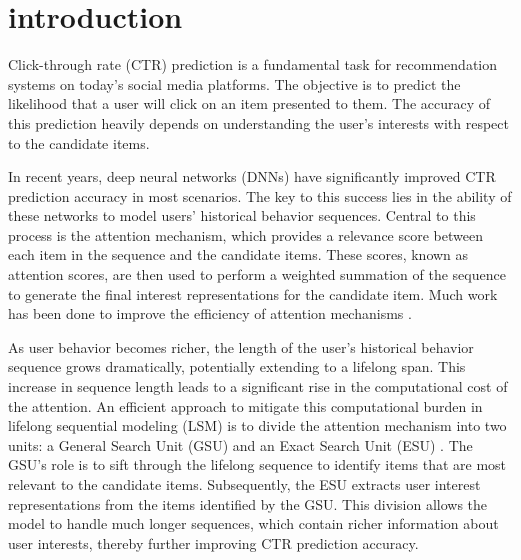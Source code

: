 \section{introduction}

Click-through rate (CTR) prediction is a fundamental task for recommendation systems on today's social media platforms. The objective is to predict the likelihood that a user will click on an item presented to them. The accuracy of this prediction heavily depends on understanding the user's interests with respect to the candidate items.

In recent years, deep neural networks (DNNs) have significantly improved CTR prediction accuracy in most scenarios. The key to this success lies in the ability of these networks to model users' historical behavior sequences. Central to this process is the attention mechanism, which provides a relevance score between each item in the sequence and the candidate items. These scores, known as attention scores, are then used to perform a weighted summation of the sequence to generate the final interest representations for the candidate item. Much work has been done to improve the efficiency of attention mechanisms \cite{zhou2018deep, zhou2019deep}.

As user behavior becomes richer, the length of the user's historical behavior sequence grows dramatically, potentially extending to a lifelong span. This increase in sequence length leads to a significant rise in the computational cost of the attention. An efficient approach to mitigate this computational burden in lifelong sequential modeling (LSM) is to divide the attention mechanism into two units: a General Search Unit (GSU) and an Exact Search Unit (ESU) \cite{pi2020search}. The GSU's role is to sift through the lifelong sequence to identify items that are most relevant to the candidate items. Subsequently, the ESU extracts user interest representations from the items identified by the GSU. This division allows the model to handle much longer sequences, which contain richer information about user interests, thereby further improving CTR prediction accuracy. 

